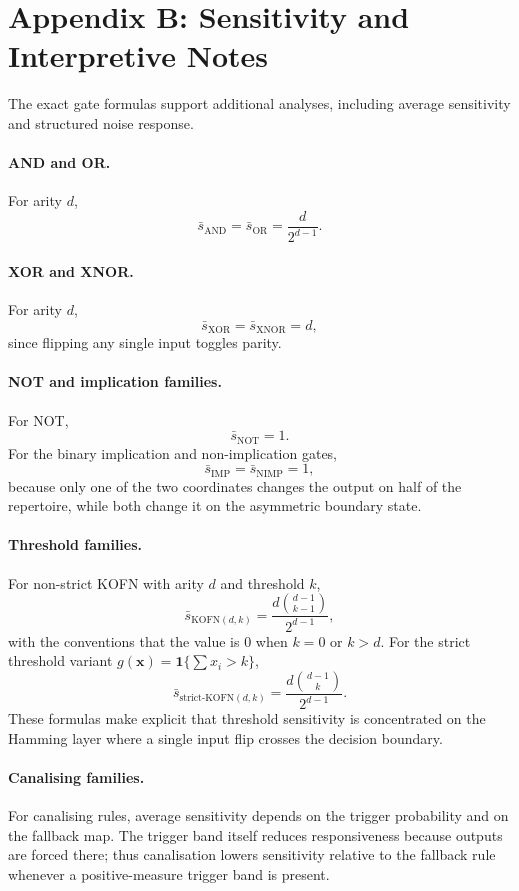 \documentclass[11pt]{article}
\theoremstyle{definition}
\begin{document}
\section{Appendix B: Sensitivity and Interpretive Notes}
The exact gate formulas support additional analyses, including average sensitivity and structured noise response.

\paragraph{AND and OR.}
For arity \(d\),
\[
\bar{s}_{\mathrm{AND}}=\bar{s}_{\mathrm{OR}}=\frac{d}{2^{d-1}}.
\]

\paragraph{XOR and XNOR.}
For arity \(d\),
\[
\bar{s}_{\mathrm{XOR}}=\bar{s}_{\mathrm{XNOR}}=d,
\]
since flipping any single input toggles parity.

\paragraph{NOT and implication families.}
For NOT,
\[
\bar{s}_{\mathrm{NOT}}=1.
\]
For the binary implication and non-implication gates,
\[
\bar{s}_{\mathrm{IMP}}=\bar{s}_{\mathrm{NIMP}}=1,
\]
because only one of the two coordinates changes the output on half of the repertoire, while both change it on the asymmetric boundary state.

\paragraph{Threshold families.}
For non-strict KOFN with arity \(d\) and threshold \(k\),
\[
\bar{s}_{\mathrm{KOFN}(d,k)}=\frac{d\binom{d-1}{k-1}}{2^{d-1}},
\]
with the conventions that the value is \(0\) when \(k=0\) or \(k>d\). For the strict threshold variant \(g(\mathbf{x})=\mathbf{1}\{\sum x_i>k\}\),
\[
\bar{s}_{\mathrm{strict\text{-}KOFN}(d,k)}=\frac{d\binom{d-1}{k}}{2^{d-1}}.
\]
These formulas make explicit that threshold sensitivity is concentrated on the Hamming layer where a single input flip crosses the decision boundary.

\paragraph{Canalising families.}
For canalising rules, average sensitivity depends on the trigger probability and on the fallback map. The trigger band itself reduces responsiveness because outputs are forced there; thus canalisation lowers sensitivity relative to the fallback rule whenever a positive-measure trigger band is present.
\end{document}
